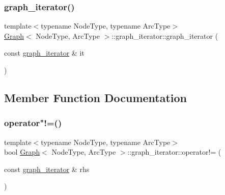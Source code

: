 \mbox{\label{classGraph_1_1graph__iterator_a00adcee70789e661ca2398e9d2e18500}} 
\subsubsection{\texorpdfstring{graph\+\_\+iterator()}{graph\_iterator()}\hspace{0.1cm}{\footnotesize\ttfamily [3/3]}}
{\footnotesize\ttfamily template$<$typename Node\+Type, typename Arc\+Type$>$ \\
\mbox{\hyperlink{classGraph}{Graph}}$<$ Node\+Type, Arc\+Type $>$\+::graph\+\_\+iterator\+::graph\+\_\+iterator (\begin{DoxyParamCaption}\item[{const \mbox{\hyperlink{classGraph_1_1graph__iterator}{graph\+\_\+iterator}} \&}]{it }\end{DoxyParamCaption})\hspace{0.3cm}{\ttfamily [inline]}}



\subsection{Member Function Documentation}
\mbox{\label{classGraph_1_1graph__iterator_a76d8ed147d8028d4cb71bd0075ca018d}} 
\subsubsection{\texorpdfstring{operator"!=()}{operator!=()}}
{\footnotesize\ttfamily template$<$typename Node\+Type, typename Arc\+Type$>$ \\
bool \mbox{\hyperlink{classGraph}{Graph}}$<$ Node\+Type, Arc\+Type $>$\+::graph\+\_\+iterator\+::operator!= (\begin{DoxyParamCaption}\item[{const \mbox{\hyperlink{classGraph_1_1graph__iterator}{graph\+\_\+iterator}} \&}]{rhs }\end{DoxyParamCaption})\hspace{0.3cm}{\ttfamily [inline]}}

